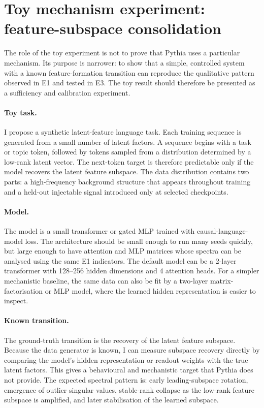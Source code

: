
\section{Toy mechanism experiment: feature-subspace consolidation}
\label{sec:toy-feature-consolidation}

The role of the toy experiment is not to prove that Pythia uses a particular mechanism. Its purpose is narrower: to show that a simple, controlled system with a known feature-formation transition can reproduce the qualitative pattern observed in E1 and tested in E3. The toy result should therefore be presented as a sufficiency and calibration experiment.

\paragraph{Toy task.}
I propose a synthetic latent-feature language task. Each training sequence is generated from a small number of latent factors. A sequence begins with a task or topic token, followed by tokens sampled from a distribution determined by a low-rank latent vector. The next-token target is therefore predictable only if the model recovers the latent feature subspace. The data distribution contains two parts: a high-frequency background structure that appears throughout training and a held-out injectable signal introduced only at selected checkpoints.

\paragraph{Model.}
The model is a small transformer or gated MLP trained with causal-language-model loss. The architecture should be small enough to run many seeds quickly, but large enough to have attention and MLP matrices whose spectra can be analysed using the same E1 indicators. The default model can be a 2-layer transformer with 128--256 hidden dimensions and 4 attention heads. For a simpler mechanistic baseline, the same data can also be fit by a two-layer matrix-factorisation or MLP model, where the learned hidden representation is easier to inspect.

\paragraph{Known transition.}
The ground-truth transition is the recovery of the latent feature subspace. Because the data generator is known, I can measure subspace recovery directly by comparing the model's hidden representation or readout weights with the true latent factors. This gives a behavioural and mechanistic target that Pythia does not provide. The expected spectral pattern is: early leading-subspace rotation, emergence of outlier singular values, stable-rank collapse as the low-rank feature subspace is amplified, and later stabilisation of the learned subspace.

